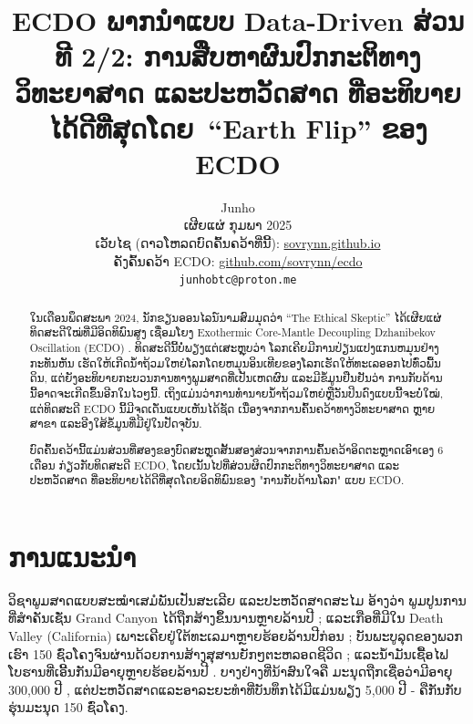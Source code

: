 \documentclass[10pt,twocolumn,letterpaper]{article}
\begin{document}
\title{ECDO ພາກນຳແບບ Data-Driven ສ່ວນທີ 2/2: ການສືບຫາຜົນປົກກະຕິທາງວິທະຍາສາດ ແລະປະຫວັດສາດ ທີ່ອະທິບາຍໄດ້ດີທີ່ສຸດໂດຍ “Earth Flip” ຂອງ ECDO}

\author{Junho\\
ເຜີຍແຜ່ ກຸມພາ 2025\\
ເວັບໄຊ (ດາວໂຫລດບົດຄົ້ນຄວ້າທີ່ນີ້): \href{https://sovrynn.github.io}{sovrynn.github.io}\\
ຄັງຄົ້ນຄວ້າ ECDO: \href{https://github.com/sovrynn/ecdo}{github.com/sovrynn/ecdo}\\
{\tt\small junhobtc@proton.me}
}

\maketitle

\begin{abstract}
ໃນເດືອນພຶດສະພາ 2024, ນັກຂຽນອອນໄລນ໌ນາມສົມມຸດວ່າ “The Ethical Skeptic” \cite{0} ໄດ້ເຜີຍແຜ່ທິດສະດີໃໝ່ທີ່ມີອິດທິພົນສູງ ເຊື່ອມໂຍງ Exothermic Core-Mantle Decoupling Dzhanibekov Oscillation (ECDO) \cite{1}. ທິດສະດີນີ້ບໍ່ພຽງແຕ່ເສະຫຼຸບວ່າ ໂລກເຄີຍມີການປ່ຽນແປງແກນຫມຸນຢ່າງກະທັນຫັນ ເຮັດໃຫ້ເກີດນ້ຳຖ້ວມໃຫຍ່ໂລກໂດຍຫມຸນອິນເທີຍຂອງໂລກເຮັດໃຫ້ທະເລອອກໄປທົ່ວພື້ນດິນ, ແຕ່ຍັງອະທິບາຍກະບວນການທາງພູມສາດທີ່ເປັນເຫດຜົນ ແລະມີຂໍ້ມູນຢືນຢັນວ່າ ການກັບດ້ານນີ້ອາດຈະເກີດຂຶ້ນອີກໃນໄວໆນີ້. ເຖິງແມ່ນວ່າການທຳນາຍນ້ຳຖ້ວມໃຫຍ່ຫຼືວັນປິນດົງແບບນີ້ຈະບໍ່ໃໝ່, ແຕ່ທິດສະດີ ECDO ນີ້ມີຈຸດເດັ່ນແບບເຫັນໄດ້ຊັດ ເນື່ອງຈາກການຄົ້ນຄວ້າທາງວິທະຍາສາດ ຫຼາຍສາຂາ ແລະອີງໃສ້ຂໍ້ມູນທີ່ມີຢູ່ໃນປັດຈຸບັນ.

ບົດຄົ້ນຄວ້ານີ້ແມ່ນສ່ວນທີ່ສອງຂອງບົດສະຫຼຸດສັ້ນສອງສ່ວນຈາກການຄົ້ນຄວ້າອິດຕະຫຼາດເອົາເອງ 6 ເດືອນ \cite{2,20} ກ່ຽວກັບທິດສະດີ ECDO, ໂດຍເນັ້ນໄປທີ່ສ່ວນຜິດປົກກະຕິທາງວິທະຍາສາດ ແລະປະຫວັດສາດ ທີ່ອະທິບາຍໄດ້ດີທີ່ສຸດໂດຍອິດທິພົນຂອງ "ການກັບດ້ານໂລກ" ແບບ ECDO.

\end{abstract}

\section{ການແນະນຳ}

ວິຊາພູມສາດແບບສະໝຳເສມໍພັນເປັນສະເລີຍ ແລະປະຫວັດສາດສະໄມ ອ້າງວ່າ ພູມປູນການທີ່ສຳຄັນເຊັ່ນ Grand Canyon ໄດ້ຖືກສ້າງຂຶ້ນນານຫຼາຍລ້ານປີ \cite{143}; ແລະເກືອທີ່ມີໃນ Death Valley (California) ເພາະເຄີຍຢູ່ໃຕ້ທະເລມາຫຼາຍຮ້ອຍລ້ານປີກ່ອນ \cite{144}; ບັນພະບູລຸດຂອງພວກເຮົາ 150 ຊົ່ວໂຄງຈົນຜ່ານດ້ວຍການສ້າງສຸສານຍັກໆຕະຫລອດຊີວິດ \cite{29,70}; ແລະນ້ຳມັນເຊື້ອໄຟໂບຮານທີ່ເອີ້ນກັນມີອາຍຸຫຼາຍຮ້ອຍລ້ານປີ \cite{104}. ບາງຢ່າງທີ່ນ້າສົນໃຈຄື ມະນຸດຖືກເຊື່ອວ່າມີອາຍຸ 300,000 ປີ \cite{145}, ແຕ່ປະຫວັດສາດແລະອາລະຍະທຳທີ່ບັນທຶກໄດ້ມີແມ່ນພຽງ 5,000 ປີ - ຄືກັນກັບຮຸ່ນມະນຸດ 150 ຊົ່ວໂຄງ.
\end{document}
